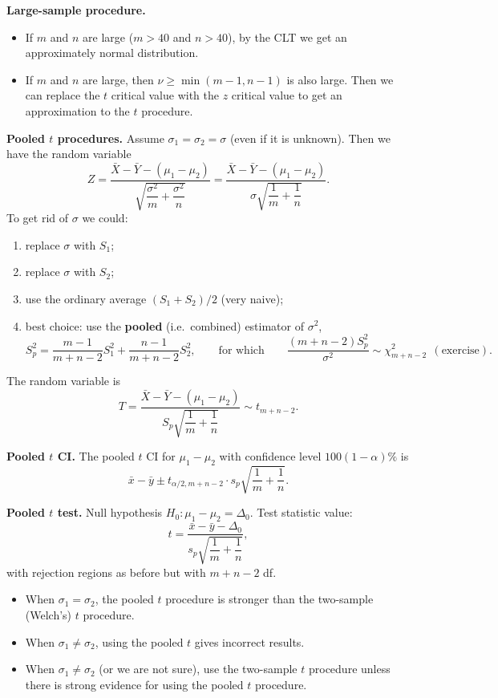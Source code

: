 \textbf{Large-sample procedure.}
\begin{itemize}
  \item If $m$ and $n$ are large ($m>40$ and $n>40$), by the CLT we get an approximately normal distribution.
  \item If $m$ and $n$ are large, then $\nu\ge\min(m-1,n-1)$ is also large. Then we can replace the $t$ critical value with the $z$ critical value to get an approximation to the $t$ procedure.
\end{itemize}

\textbf{Pooled $t$ procedures.} Assume $\sigma_1=\sigma_2=\sigma$ (even if it is unknown). Then we have the random variable
\[
Z = \frac{\bar{X}-\bar{Y}-(\mu_1-\mu_2)}{\sqrt{\dfrac{\sigma^2}{m}+\dfrac{\sigma^2}{n}}} = \frac{\bar{X}-\bar{Y}-(\mu_1-\mu_2)}{\sigma\sqrt{\dfrac{1}{m}+\dfrac{1}{n}}}.
\]
To get rid of $\sigma$ we could:
\begin{enumerate}
  \item replace $\sigma$ with $S_1$;
  \item replace $\sigma$ with $S_2$;
  \item use the ordinary average $(S_1+S_2)/2$ (very naive);
  \item best choice: use the \textbf{pooled} (i.e.\ combined) estimator of $\sigma^2$,
  \[
  S_p^2 = \frac{m-1}{m+n-2}S_1^2 + \frac{n-1}{m+n-2}S_2^2,
  \qquad\text{for which}\qquad
  \frac{(m+n-2)S_p^2}{\sigma^2}\sim\chi^2_{m+n-2}\ \ (\text{exercise}).
  \]
\end{enumerate}
The random variable is
\[
T = \frac{\bar{X}-\bar{Y}-(\mu_1-\mu_2)}{S_p\sqrt{\dfrac{1}{m}+\dfrac{1}{n}}} \sim t_{m+n-2}.
\]

\textbf{Pooled $t$ CI.} The pooled $t$ CI for $\mu_1-\mu_2$ with confidence level $100(1-\alpha)\%$ is
\[
\bar{x}-\bar{y}\pm t_{\alpha/2,m+n-2}\cdot s_p\sqrt{\frac{1}{m}+\frac{1}{n}} .
\]

\textbf{Pooled $t$ test.} Null hypothesis $H_0:\mu_1-\mu_2=\Delta_0$. Test statistic value:
\[
t = \frac{\bar{x}-\bar{y}-\Delta_0}{s_p\sqrt{\dfrac{1}{m}+\dfrac{1}{n}}},
\]
with rejection regions as before but with $m+n-2$ df.

\begin{itemize}
  \item When $\sigma_1=\sigma_2$, the pooled $t$ procedure is stronger than the two-sample (Welch's) $t$ procedure.
  \item When $\sigma_1\ne\sigma_2$, using the pooled $t$ gives incorrect results.
  \item When $\sigma_1\ne\sigma_2$ (or we are not sure), use the two-sample $t$ procedure unless there is strong evidence for using the pooled $t$ procedure.
\end{itemize}


